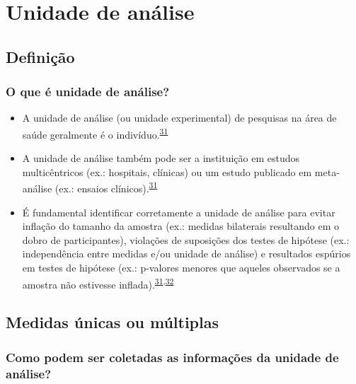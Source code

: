 \documentclass[
  a4paper,
]{book}
\begin{document}
\hypertarget{unidade-analise}{%
\chapter{\texorpdfstring{\textbf{Unidade de análise}}{Unidade de análise}}\label{unidade-analise}}

\hypertarget{definicao}{%
\section{Definição}\label{definicao}}

\hypertarget{o-que-uxe9-unidade-de-anuxe1lise}{%
\subsection{O que é unidade de análise?}\label{o-que-uxe9-unidade-de-anuxe1lise}}

\begin{itemize}
\item
  A unidade de análise (ou unidade experimental) de pesquisas na área de saúde geralmente é o indivíduo.\textsuperscript{\protect\hyperlink{ref-Altman1997}{31}}
\item
  A unidade de análise também pode ser a instituição em estudos multicêntricos (ex.: hospitais, clínicas) ou um estudo publicado em meta-análise (ex.: ensaios clínicos).\textsuperscript{\protect\hyperlink{ref-Altman1997}{31}}
\item
  É fundamental identificar corretamente a unidade de análise para evitar inflação do tamanho da amostra (ex.: medidas bilaterais resultando em o dobro de participantes), violações de suposições dos testes de hipótese (ex.: independência entre medidas e/ou unidade de análise) e resultados espúrios em testes de hipótese (ex.: p-valores menores que aqueles observados se a amostra não estivesse inflada).\textsuperscript{\protect\hyperlink{ref-Altman1997}{31},\protect\hyperlink{ref-Matthews1990}{32}}
\end{itemize}

\hypertarget{medidas}{%
\section{Medidas únicas ou múltiplas}\label{medidas}}

\hypertarget{como-podem-ser-coletadas-as-informauxe7uxf5es-da-unidade-de-anuxe1lise}{%
\subsection{Como podem ser coletadas as informações da unidade de análise?}\label{como-podem-ser-coletadas-as-informauxe7uxf5es-da-unidade-de-anuxe1lise}}
\end{document}
